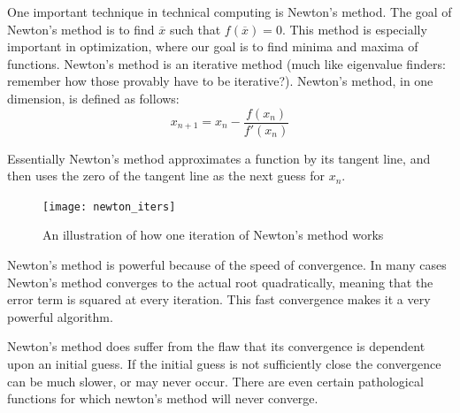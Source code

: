 \label{lab:NewtonsMethod}

One important technique in technical computing is Newton's method.
The goal of Newton's method is to find $\overline{x}$ such that $f\left(\overline{x}\right) = 0$.
This method is especially important in optimization, where our goal is to find minima and maxima of functions.
Newton's method is an iterative method (much like eigenvalue finders: remember how those provably have to be iterative?).
Newton's method, in one dimension, is defined as follows:
\[
x_{n+1} = x_n - \frac{f(x_n)}{f'(x_n)}
\]

Essentially Newton's method approximates a function by its tangent line, and then uses the zero of the tangent line as the next guess for $x_n$.

\begin{figure}[h]
\centering
\texttt{[image: newton\_iters]}
\caption{An illustration of how one iteration of Newton's method works}
\end{figure}

Newton's method is powerful because of the speed of convergence.
In many cases Newton's method converges to the actual root quadratically, meaning that the error term is squared at every iteration.
This fast convergence makes it a very powerful algorithm.

Newton's method does suffer from the flaw that its convergence is dependent upon an initial guess.
If the initial guess is not sufficiently close the convergence can be much slower, or may never occur.
There are even certain pathological functions for which newton's method will never converge.

